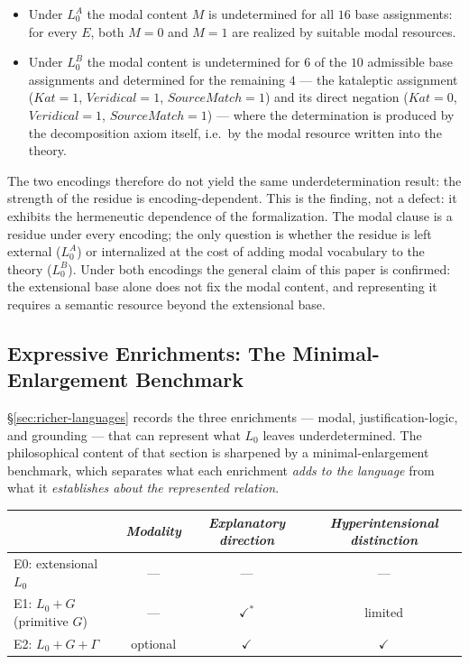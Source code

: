 \documentclass[11pt]{article}
\theoremstyle{plain}
\theoremstyle{definition}
\theoremstyle{remark}
\begin{document}
\begin{itemize}
\item Under $L_0^A$ the modal content $M$ is undetermined for all
$16$ base assignments: for every $E$, both $M=0$ and $M=1$ are
realized by suitable modal resources.
\item Under $L_0^B$ the modal content is undetermined for $6$ of the
$10$ admissible base assignments and determined for the remaining
$4$ --- the kataleptic assignment ($Kat=1$, $Veridical=1$,
$SourceMatch=1$) and its direct negation ($Kat=0$, $Veridical=1$,
$SourceMatch=1$) --- where the determination is produced by the
decomposition axiom itself, i.e.\ by the modal resource written into
the theory.
\end{itemize}

The two encodings therefore do not yield the same underdetermination
result: the strength of the residue is encoding-dependent. This is the
finding, not a defect: it exhibits the hermeneutic dependence of the
formalization. The modal clause is a residue under every encoding; the
only question is whether the residue is left external ($L_0^A$) or
internalized at the cost of adding modal vocabulary to the theory
($L_0^B$). Under both encodings the general claim of this paper is
confirmed: the extensional base alone does not fix the modal content,
and representing it requires a semantic resource beyond the
extensional base.

\subsection{Expressive Enrichments: The Minimal-Enlargement Benchmark}
\label{sec:e0e1e2}

\S\ref{sec:richer-languages} records the three enrichments --- modal,
justification-logic, and grounding --- that can represent what $L_0$
leaves underdetermined. The philosophical content of that section is
sharpened by a minimal-enlargement benchmark, which separates what each
enrichment \emph{adds to the language} from what it \emph{establishes
about the represented relation}.

\begin{center}
\begin{tabular}{@{}lccc@{}}
\toprule
 & \emph{Modality} & \emph{Explanatory direction} & \emph{Hyperintensional distinction}\\
\midrule
E0: extensional $L_0$ & --- & --- & ---\\
E1: $L_0 + G$ (primitive $G$) & --- & $\checkmark^{*}$ & limited\\
E2: $L_0 + G + \Gamma$ & optional & $\checkmark$ & $\checkmark$\\
\bottomrule
\end{tabular}
\end{center}
\end{document}
